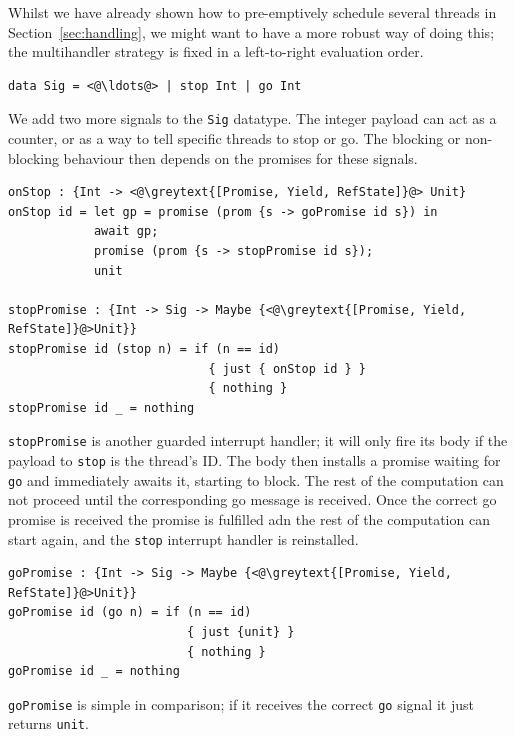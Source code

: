 \documentclass[msc,deptreport,cs]{infthesis} %
\newcommand{\code}[1]{\lstinline{#1}}
\newcommand{\greytext}[1]{\textcolor{black!40}{#1}}
\newcommand{\todo}[1]
           {{\par\noindent\small\color{RoyalPurple}
  \framebox{\parbox{\dimexpr\linewidth-2\fboxsep-2\fboxrule}
    {\textbf{TODO:} #1}}}}
\begin{document}
Whilst we have already shown how to pre-emptively schedule several threads in
Section~\ref{sec:handling}, we might want to have a more robust way of doing
this; the multihandler strategy is fixed in a left-to-right evaluation order.

\todo{Add more}

\begin{lstlisting}
data Sig = <@\ldots@> | stop Int | go Int
\end{lstlisting}

We add two more signals to the \code{Sig} datatype. The integer payload can act
as a counter, or as a way to tell specific threads to stop or go. The blocking
or non-blocking behaviour then depends on the promises for these signals.

\begin{lstlisting}
onStop : {Int -> <@\greytext{[Promise, Yield, RefState]}@> Unit}
onStop id = let gp = promise (prom {s -> goPromise id s}) in
            await gp;
            promise (prom {s -> stopPromise id s});
            unit

stopPromise : {Int -> Sig -> Maybe {<@\greytext{[Promise, Yield, RefState]}@>Unit}}
stopPromise id (stop n) = if (n == id)
                            { just { onStop id } }
                            { nothing }
stopPromise id _ = nothing
\end{lstlisting}

\code{stopPromise} is another guarded interrupt handler; it will only fire its
body if the payload to \code{stop} is the thread's ID. The body then installs a
promise waiting for \code{go} and immediately awaits it, starting to block. The
rest of the computation can not proceed until the corresponding go message is
received. Once the correct go promise is received the promise is fulfilled adn
the rest of the computation can start again, and the \code{stop} interrupt
handler is reinstalled.

\begin{lstlisting}
goPromise : {Int -> Sig -> Maybe {<@\greytext{[Promise, Yield, RefState]}@>Unit}}
goPromise id (go n) = if (n == id)
                         { just {unit} }
                         { nothing }
goPromise id _ = nothing
\end{lstlisting}

\code{goPromise} is simple in comparison; if it receives the correct \code{go} signal
it just returns \code{unit}.

\end{document}

